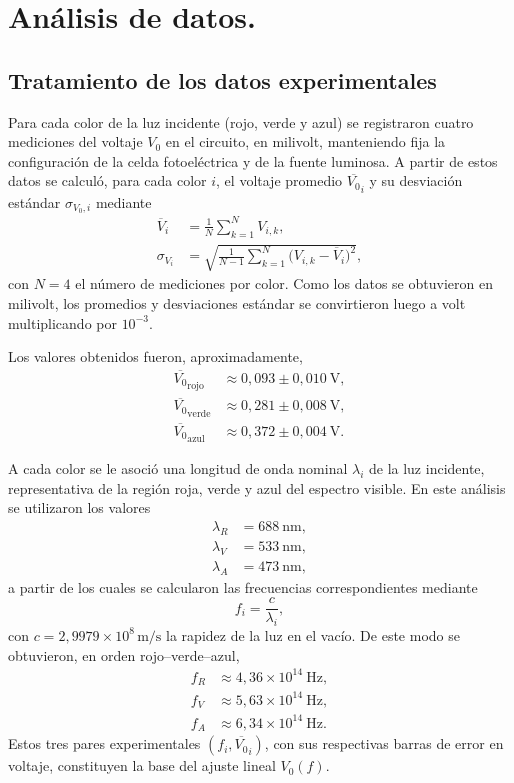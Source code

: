 \documentclass[11pt,twocolumn]{article}
\begin{document}
\section{Análisis de datos.}

\subsection{Tratamiento de los datos experimentales}

Para cada color de la luz incidente (rojo, verde y azul) se
registraron cuatro mediciones del voltaje $V_0$ en el circuito, en
milivolt, manteniendo fija la configuración de la celda
fotoeléctrica y de la fuente luminosa. A partir de estos datos se
calculó, para cada color $i$, el voltaje promedio $\overline{V_0}_i$
y su desviación estándar $\sigma_{V_0,i}$ mediante
\begin{align*}
    \overline{V}_i &= \frac{1}{N}\sum_{k=1}^{N} V_{i,k},
    \\[4pt]
    \sigma_{V_i} &= \sqrt{\frac{1}{N-1}
      \sum_{k=1}^{N} \bigl(V_{i,k} - \overline{V}_i\bigr)^2},
\end{align*}
con $N = 4$ el número de mediciones por color. Como los datos se
obtuvieron en milivolt, los promedios y desviaciones estándar se
convirtieron luego a volt multiplicando por $10^{-3}$.

Los valores obtenidos fueron, aproximadamente,
\begin{align*}
    \overline{V_0}_{\text{rojo}} &\approx 0{,}093 \pm 0{,}010~\text{V},\\
    \overline{V_0}_{\text{verde}} &\approx 0{,}281 \pm 0{,}008~\text{V},\\
    \overline{V_0}_{\text{azul}} &\approx 0{,}372 \pm 0{,}004~\text{V}.
\end{align*}

A cada color se le asoció una longitud de onda nominal $\lambda_i$
de la luz incidente, representativa de la región roja, verde y azul
del espectro visible. En este análisis se utilizaron los valores
\begin{align*}
    \lambda_R &= 688~\text{nm}, \\[4pt]
    \lambda_V &= 533~\text{nm}, \\[4pt]
    \lambda_A &= 473~\text{nm},
\end{align*}
a partir de los cuales se calcularon las frecuencias correspondientes
mediante
\begin{equation*}
    f_i = \frac{c}{\lambda_i},
\end{equation*}
con $c = 2{,}9979\times 10^{8}\,\text{m/s}$ la rapidez de la luz en el
vacío. De este modo se obtuvieron, en orden rojo–verde–azul,
\begin{align*}
    f_R &\approx 4{,}36\times 10^{14}~\text{Hz},\\[4pt]
    f_V &\approx 5{,}63\times 10^{14}~\text{Hz},\\[4pt]
    f_A &\approx 6{,}34\times 10^{14}~\text{Hz}.
\end{align*}
Estos tres pares experimentales $(f_i, \overline{V_0}_i)$, con sus
respectivas barras de error en voltaje, constituyen la base del
ajuste lineal $V_0(f)$.
\end{document}
